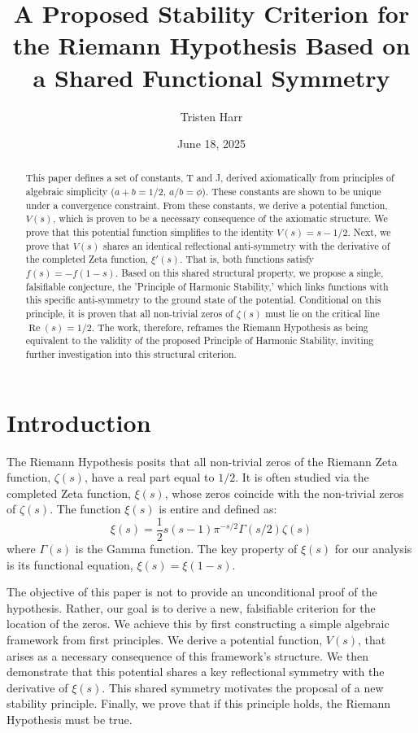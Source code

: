 \documentclass{amsart}
\theoremstyle{plain}
\theoremstyle{definition}
\theoremstyle{remark}
\DeclareMathOperator{\re}{Re}
\begin{document}
\title[A Proposed Stability Criterion for the RH]{A Proposed Stability Criterion for the Riemann Hypothesis Based on a Shared Functional Symmetry}
\author{Tristen Harr}
\date{June 18, 2025}
\address{Saint Charles, Missouri, United States}

\begin{abstract}
This paper defines a set of constants, T and J, derived axiomatically from principles of algebraic simplicity ($a+b=1/2$, $a/b=\phi$). These constants are shown to be unique under a convergence constraint. From these constants, we derive a potential function, $V(s)$, which is proven to be a necessary consequence of the axiomatic structure. We prove that this potential function simplifies to the identity $V(s) = s - 1/2$. Next, we prove that $V(s)$ shares an identical reflectional anti-symmetry with the derivative of the completed Zeta function, $\xi'(s)$. That is, both functions satisfy $f(s) = -f(1-s)$. Based on this shared structural property, we propose a single, falsifiable conjecture, the 'Principle of Harmonic Stability,' which links functions with this specific anti-symmetry to the ground state of the potential. Conditional on this principle, it is proven that all non-trivial zeros of $\zeta(s)$ must lie on the critical line $\re(s)=1/2$. The work, therefore, reframes the Riemann Hypothesis as being equivalent to the validity of the proposed Principle of Harmonic Stability, inviting further investigation into this structural criterion.
\end{abstract}

\maketitle

\section{Introduction}
The Riemann Hypothesis posits that all non-trivial zeros of the Riemann Zeta function, $\zeta(s)$, have a real part equal to $1/2$. It is often studied via the completed Zeta function, $\xi(s)$, whose zeros coincide with the non-trivial zeros of $\zeta(s)$. The function $\xi(s)$ is entire and defined as:
$$ \xi(s) = \frac{1}{2}s(s-1)\pi^{-s/2}\Gamma(s/2)\zeta(s) $$
where $\Gamma(s)$ is the Gamma function. The key property of $\xi(s)$ for our analysis is its functional equation, $\xi(s) = \xi(1-s)$.

The objective of this paper is not to provide an unconditional proof of the hypothesis. Rather, our goal is to derive a new, falsifiable criterion for the location of the zeros. We achieve this by first constructing a simple algebraic framework from first principles. We derive a potential function, $V(s)$, that arises as a necessary consequence of this framework's structure. We then demonstrate that this potential shares a key reflectional symmetry with the derivative of $\xi(s)$. This shared symmetry motivates the proposal of a new stability principle. Finally, we prove that if this principle holds, the Riemann Hypothesis must be true.
\end{document}
